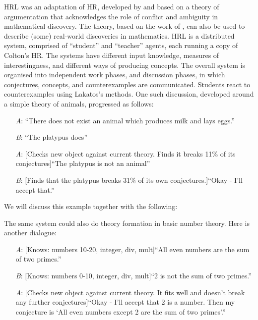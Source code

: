 \begin{ep}\label{ex:platypus}
{\sf HRL} was an adaptation of {\sf HR}, developed by \citet{pease07} and 
based on a theory of argumentation that acknowledges the role of conflict and ambiguity in mathematical discovery.  The theory, based on the work of
\citet{lakatos}, can also be used to describe (some) real-world
discoveries in mathematics.  {\sf HRL} is a distributed system,
comprised of ``student'' and ``teacher'' agents, each running a copy
of Colton's {\sf HR}.  The systems have different input knowledge,
measures of interestingness, and different ways of producing concepts.
The overall system is organised into independent work phases, and
discussion phases, in which conjectures, concepts, and counterexamples
are communicated.  Students react to counterexamples using Lakatos's
methods.  One such discussion, developed around a simple theory of
animals, progressed as follows:
\begin{itemize}
\item[\emph{A}:] ``There does not exist an animal which produces milk and lays eggs.''
\item[\emph{B}:] ``The platypus does''
\item[\emph{A}:] {[}Checks new object against current theory. Finds it breaks 11\% of its conjectures{]}\newline ``The platypus is not an animal''
\item[\emph{B}:] {[}Finds that the platypus breaks 31\% of its own conjectures.{]}\newline ``Okay - I'll accept that.''
\end{itemize}
\end{ep}

We will discuss this example together with the following:

\begin{ep}\label{ex:goldbach}
The same system could also do theory formation in basic number theory.
Here is another dialogue:
\begin{itemize}
\item[\emph{A}:] {[}Knows: numbers 10-20, integer, div, mult{]}\newline ``All even numbers are the sum of two primes.''
\item[\emph{B}:] {[}Knows: numbers 0-10, integer, div, mult{]}\newline ``2 is not the sum of two primes.''
\item[\emph{A}:] {[}Checks new object against current theory. It fits well and doesn't break any further conjectures{]}\newline ``Okay - I'll accept that 2 is a number. Then my conjecture is `All even numbers except 2 are the sum of two primes'.''
\end{itemize}
\end{ep}

